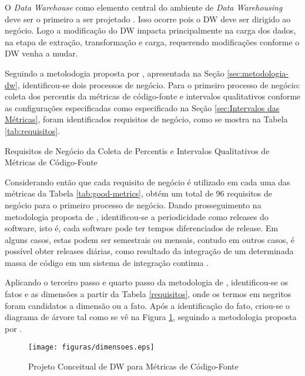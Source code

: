 O \textit{Data Warehouse} como elemento central do ambiente de \textit{Data Warehousing} deve ser o primeiro a ser projetado \cite{Kimball2002}. Isso ocorre pois o DW deve ser dirigido ao negócio. Logo a modificação do DW impacta principalmente na carga dos dados, na etapa de extração, transformação e carga, requerendo modificações conforme o DW venha a mudar.

Seguindo a metolodogia proposta por , apresentada na Seção \ref{sec:metodologia-dw}, identificou-se dois processos de negócio. Para o primeiro processo de negócio: coleta dos percentis da métricas de código-fonte e intervalos qualitativos conforme as configurações especificadas como especificado na Seção \ref{sec:Intervalos das Métricas}, foram identificados requisitos de negócio, como se mostra na Tabela \ref{tab:requisitos}.

\begin{table}[!ht]
\centering

\caption{Requisitos de Negócio da Coleta de Percentis e Intervalos Qualitativos de Métricas de Código-Fonte}
\label{tab:requisitos}
\end{table}
\FloatBarrier

Considerando então que cada requisito de negócio é utilizado em cada uma das métricas da Tabela \ref{tab:good-metrics}, obtém um total de 96 requisitos de negócio para o primeiro processo de negócio. Dando prosseguimento na metodologia proposta de , identificou-se a periodicidade como releases do software, isto é, cada software pode ter tempos diferenciados de release. Em alguns casos, estas podem ser semestrais ou mensais, contudo em outros casos, é possível obter releases diárias, como resultado da integração de um determinada massa de código em um sistema de integração continua \cite{beckarticle1999}. 

Aplicando o terceiro passo e quarto passo da metodologia de , identificou-se os fatos e as dimensões a partir da Tabela \ref{requisitos}, onde os termos em negritos foram candidatos a dimensão ou a fato. Após a identificação do fato, criou-se o diagrama de árvore tal como se vê na Figura \ref{dimensoes}, seguindo a metodologia proposta por .

\begin{figure}[ht!]
\centering
\texttt{[image: figuras/dimensoes.eps]}
\caption{Projeto Conceitual de DW para Métricas de Código-Fonte}
\label{dimensoes}
\end{figure}
\FloatBarrier

